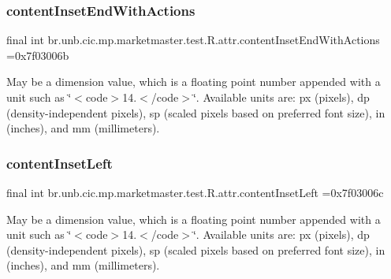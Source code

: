 \subsubsection{\texorpdfstring{content\+Inset\+End\+With\+Actions}{contentInsetEndWithActions}}
{\footnotesize\ttfamily final int br.\+unb.\+cic.\+mp.\+marketmaster.\+test.\+R.\+attr.\+content\+Inset\+End\+With\+Actions =0x7f03006b\hspace{0.3cm}{\ttfamily [static]}}

May be a dimension value, which is a floating point number appended with a unit such as \char`\"{}$<$code$>$14.\+5sp$<$/code$>$\char`\"{}. Available units are\+: px (pixels), dp (density-\/independent pixels), sp (scaled pixels based on preferred font size), in (inches), and mm (millimeters). \mbox{\label{classbr_1_1unb_1_1cic_1_1mp_1_1marketmaster_1_1test_1_1R_1_1attr_adb01a79e2657d2da655e30d4bf5c30c9}} 
\subsubsection{\texorpdfstring{content\+Inset\+Left}{contentInsetLeft}}
{\footnotesize\ttfamily final int br.\+unb.\+cic.\+mp.\+marketmaster.\+test.\+R.\+attr.\+content\+Inset\+Left =0x7f03006c\hspace{0.3cm}{\ttfamily [static]}}

May be a dimension value, which is a floating point number appended with a unit such as \char`\"{}$<$code$>$14.\+5sp$<$/code$>$\char`\"{}. Available units are\+: px (pixels), dp (density-\/independent pixels), sp (scaled pixels based on preferred font size), in (inches), and mm (millimeters). \mbox{\label{classbr_1_1unb_1_1cic_1_1mp_1_1marketmaster_1_1test_1_1R_1_1attr_a47582d59b271a8f7296d57147e65c5ed}} 
